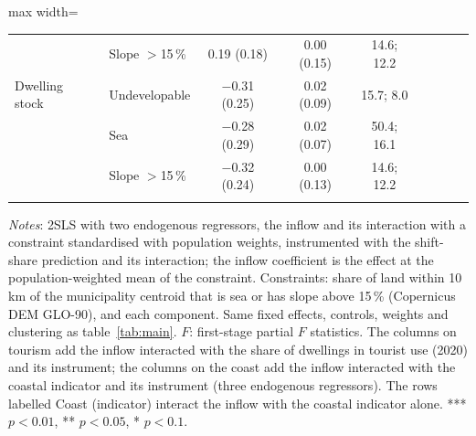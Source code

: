 \begin{table}[!htbp]
\begin{adjustbox}{max width=\linewidth}
\begin{tabular}{llccccccc}
 & Slope $>$15\,\% & 0.19 (0.18) & 0.00 (0.15) & 14.6; 12.2 & &  & & \\
\addlinespace
Dwelling stock & Undevelopable & $-$0.31 (0.25) & 0.02 (0.09) & 15.7; 8.0 & &  & & \\
 & Sea & $-$0.28 (0.29) & 0.02 (0.07) & 50.4; 16.1 & &  & & \\
 & Slope $>$15\,\% & $-$0.32 (0.24) & 0.00 (0.13) & 14.6; 12.2 & &  & & \\
\addlinespace
\bottomrule\end{tabular}\end{adjustbox}
\begin{minipage}{0.97\linewidth}\footnotesize\vspace{4pt}
\textit{Notes}: 2SLS with two endogenous regressors, the inflow and its interaction with a constraint standardised with population weights, instrumented with the shift-share prediction and its interaction; the inflow coefficient is the effect at the population-weighted mean of the constraint. Constraints: share of land within 10 km of the municipality centroid that is sea or has slope above 15\,\% (Copernicus DEM GLO-90), and each component. Same fixed effects, controls, weights and clustering as table~\ref{tab:main}. $F$: first-stage partial $F$ statistics. The columns on tourism add the inflow interacted with the share of dwellings in tourist use (2020) and its instrument; the columns on the coast add the inflow interacted with the coastal indicator and its instrument (three endogenous regressors). The rows labelled Coast (indicator) interact the inflow with the coastal indicator alone. *** $p<0.01$, ** $p<0.05$, * $p<0.1$.
\end{minipage}\end{table}